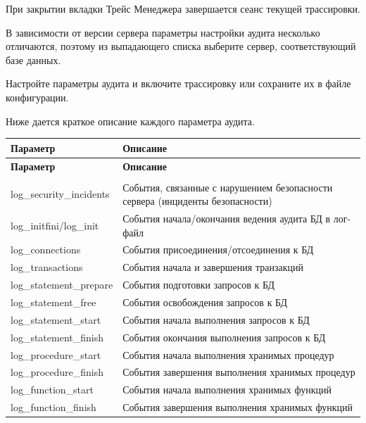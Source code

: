 \begin{redremark}
	При закрытии вкладки Трейс Менеджера завершается сеанс текущей трассировки.
\end{redremark}


В зависимости от версии сервера параметры настройки аудита несколько отличаются, поэтому из выпадающего списка выберите сервер, соответствующий базе данных.

Настройте параметры аудита и включите трассировку или сохраните их в файле конфигурации. 

Ниже дается краткое описание каждого параметра аудита.

\begin{longtable}[r]{|>{\ttfamily}m{5cm}|m{10.5cm}|}
	\hline
	\centering\normalfont\bfseries Параметр &
	\centering\arraybslash\bfseries Описание\\\hline
	\endfirsthead
	\hline
	\centering\normalfont\bfseries Параметр &
	\centering\arraybslash\bfseries Описание\\\hline
	\endhead
	\hline
	\rowcolor[gray]{.9}\multicolumn{2}{|m{15.75cm}|}{\bfseries Database}\\\hline 
	log\_security\_incidents &  События, связанные с нарушением безопасности сервера (инциденты безопасности) \\\hline
	log\_initfini/log\_init &  События начала/окончания ведения аудита БД в лог-файл  \\\hline
	log\_connections &  События присоединения/отсоединения к БД  \\\hline
	log\_transactions &  События начала и завершения транзакций  \\\hline
	log\_statement\_prepare &  События подготовки запросов к БД  \\\hline
	log\_statement\_free &  События освобождения запросов к БД \\\hline
	log\_statement\_start &  События начала выполнения запросов к БД  \\\hline
	log\_statement\_finish &  События окончания выполнения запросов к БД \\\hline
	log\_procedure\_start & События начала выполнения хранимых процедур \\\hline
	log\_procedure\_finish & События завершения выполнения хранимых процедур \\\hline
	log\_function\_start & События начала выполнения хранимых функций  \\\hline
	log\_function\_finish & События завершения выполнения хранимых функций  \\\hline

\end{longtable}
